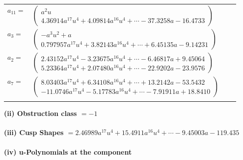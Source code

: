 \documentclass[1p]{elsarticle_modified}
\theoremstyle{definition}
\begin{document}
\begin{tabular}{m{7pt} m{180pt} m{7pt} m{180pt} }
\flushright $a_{11}=$&$\begin{pmatrix}a^2 u\\4.36914 a^{17} u^{4}+4.09814 a^{16} u^{4}+\cdots-37.3258 a-16.4733\end{pmatrix}$ \\
\flushright $a_{3}=$&$\begin{pmatrix}- a^3 u^2+a\\0.797957 a^{17} u^{4}+3.82143 a^{16} u^{4}+\cdots+6.45135 a-9.14231\end{pmatrix}$ \\
\flushright $a_{2}=$&$\begin{pmatrix}2.43152 a^{17} u^{4}-3.23675 a^{16} u^{4}+\cdots-6.46817 a+9.45064\\5.23364 a^{17} u^{4}+2.07480 a^{16} u^{4}+\cdots-22.9202 a-23.9576\end{pmatrix}$ \\
\flushright $a_{7}=$&$\begin{pmatrix}8.03403 a^{17} u^{4}+6.34108 a^{16} u^{4}+\cdots+13.2142 a-53.5432\\-11.0746 a^{17} u^{4}-5.17783 a^{16} u^{4}+\cdots-7.91911 a+18.8410\end{pmatrix}$\\&\end{tabular}
\flushleft \textbf{(ii) Obstruction class $= -1$}\\~\\
\flushleft \textbf{(iii) Cusp Shapes $= 2.46989 a^{17} u^{4}+15.4911 a^{16} u^{4}+\cdots-9.45003 a-119.435$}\\~\\
\newpage\renewcommand{\arraystretch}{1}
\flushleft \textbf{(iv) u-Polynomials at the component}\newline \\
\end{document}
